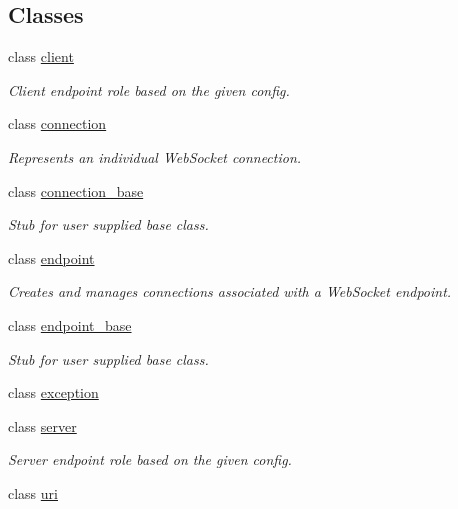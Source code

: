 \subsection*{Classes}
\begin{DoxyCompactItemize}
\item 
class \mbox{\hyperlink{classwebsocketpp_1_1client}{client}}
\begin{DoxyCompactList}\small\item\em Client endpoint role based on the given config. \end{DoxyCompactList}\item 
class \mbox{\hyperlink{classwebsocketpp_1_1connection}{connection}}
\begin{DoxyCompactList}\small\item\em Represents an individual Web\+Socket connection. \end{DoxyCompactList}\item 
class \mbox{\hyperlink{classwebsocketpp_1_1connection__base}{connection\+\_\+base}}
\begin{DoxyCompactList}\small\item\em Stub for user supplied base class. \end{DoxyCompactList}\item 
class \mbox{\hyperlink{classwebsocketpp_1_1endpoint}{endpoint}}
\begin{DoxyCompactList}\small\item\em Creates and manages connections associated with a Web\+Socket endpoint. \end{DoxyCompactList}\item 
class \mbox{\hyperlink{classwebsocketpp_1_1endpoint__base}{endpoint\+\_\+base}}
\begin{DoxyCompactList}\small\item\em Stub for user supplied base class. \end{DoxyCompactList}\item 
class \mbox{\hyperlink{classwebsocketpp_1_1exception}{exception}}
\item 
class \mbox{\hyperlink{classwebsocketpp_1_1server}{server}}
\begin{DoxyCompactList}\small\item\em Server endpoint role based on the given config. \end{DoxyCompactList}\item 
class \mbox{\hyperlink{classwebsocketpp_1_1uri}{uri}}
\end{DoxyCompactItemize}
